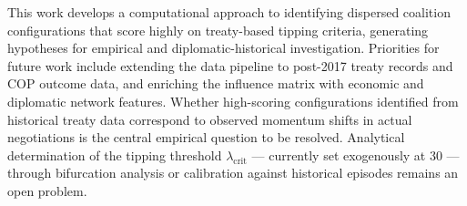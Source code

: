 \documentclass[11pt]{article}
\begin{document}
This work develops a computational approach to identifying dispersed coalition configurations that score highly on treaty-based tipping criteria, generating hypotheses for empirical and diplomatic-historical investigation. Priorities for future work include extending the data pipeline to post-2017 treaty records and COP outcome data, and enriching the influence matrix with economic and diplomatic network features. Whether high-scoring configurations identified from historical treaty data correspond to observed momentum shifts in actual negotiations is the central empirical question to be resolved. Analytical determination of the tipping threshold $\lambda_{\text{crit}}$ --- currently set exogenously at 30 --- through bifurcation analysis or calibration against historical episodes remains an open problem.

\clearpage



\end{document}
